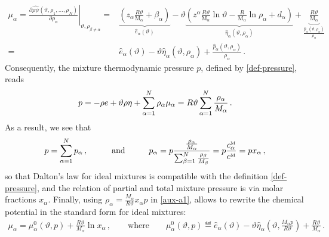 \documentclass[a4paper]{article}
\begin{document}
\begin{align}
\nonumber
\mu_\alpha = \left.\frac{\partial{\widehat{\rho\psi}(\vartheta,\rho_1,\dots,\rho_N)}}{\partial\rho_\alpha}\right|_{\vartheta,\rho_{\beta\neq\alpha}}=&
\underbrace{\left(z_\alpha\frac{R\vartheta}{\mathrm{M}_\alpha}+\beta_\alpha\right)}
_{\hat{e}_\alpha(\vartheta)}-
\vartheta\underbrace{\left(z^\alpha\frac{R\vartheta}{\mathrm{M}_\alpha}\ln\vartheta-\frac{R}{\mathrm{M}_\alpha}\ln\rho_\alpha+ d_\alpha\right)}
_{\hat{\eta}_\alpha(\vartheta,\rho_\alpha)}+\underbrace{\frac{R\vartheta}{\mathrm{M}_\alpha}}_{\frac{\hat{p}_\alpha(\vartheta,\rho_\alpha)}{\rho_\alpha}}
\\\label{aux-a1}
 =& \hat{e}_\alpha(\vartheta) - \vartheta\hat{\eta}_\alpha(\vartheta,\rho_\alpha)+ \frac{\hat{p}_\alpha(\vartheta,\rho_\alpha)}{\rho_\alpha}\,.
\end{align}
Consequently, the mixture thermodynamic pressure $p$, defined by \eqref{def-pressure}, reads
\begin{align}
p = -\rho e + \vartheta\rho\eta + \sum_{\alpha=1}^N\rho_\alpha\mu_\alpha = R\vartheta\sum_{\alpha=1}^N\frac{\rho_\alpha}{M_\alpha}\,.
\end{align}
As a result, we see that
\begin{align}
\label{eq-pressure-formula}
p = \sum_{\alpha=1}^N p_\alpha\,,\hspace{1cm}\text{and}\hspace{1cm}p_\alpha = p \frac{ \frac{\rho_\alpha}{M_\alpha}}{\sum_{\beta=1}^N\frac{\rho_\beta}{M_\beta}} = p \frac{c^{\mbox{\tiny{M}}}_\alpha}{c^{\mbox{\tiny{M}}}} = p x_\alpha\,,
\end{align}
so that Dalton's law for ideal mixtures is compatible with the definition \eqref{def-pressure}, and the relation of partial and total mixture pressure is via molar fractions $x_\alpha$. Finally, using $\rho_\alpha = \frac{M_\alpha}{R\vartheta} x_\alpha p$ in \eqref{aux-a1}, allows to rewrite the chemical potential in the standard form for ideal mixtures:
\begin{align}
\mu_\alpha = \mu_\alpha^0(\vartheta,p) + \frac{R\vartheta}{M_\alpha}\ln x_\alpha\,,\qquad\text{where}\qquad \mu^0_\alpha(\vartheta,p) \eqdef \hat{e}_\alpha(\vartheta) - \vartheta\hat{\eta}_\alpha\left(\vartheta,\frac{M_\alpha p}{R\vartheta}\right)+ \frac{R\vartheta}{M_\alpha}\,.
\end{align}
\end{document}
